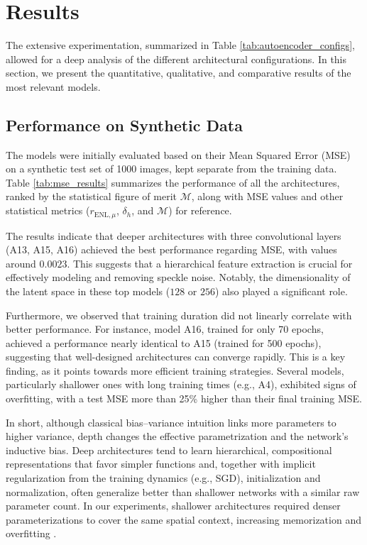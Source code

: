 \section{Results}

The extensive experimentation, summarized in Table \ref{tab:autoencoder_configs}, allowed for a deep analysis of the different architectural configurations. In this section, we present the quantitative, qualitative, and comparative results of the most relevant models.

\subsection{Performance on Synthetic Data}

The models were initially evaluated based on their Mean Squared Error (MSE) on a synthetic test set of 1000 images, kept separate from the training data. Table \ref{tab:mse_results} summarizes the performance of all the architectures, ranked by the statistical figure of merit $\mathcal{M}$, along with MSE values and other statistical metrics ($r_{\text{ENL},\mu}$, $\delta_h$, and $\mathcal{M}$) for reference.

The results indicate that deeper architectures with three convolutional layers (A13, A15, A16) achieved the best performance regarding MSE, with values around $0.0023$. This suggests that a hierarchical feature extraction is crucial for effectively modeling and removing speckle noise. Notably, the dimensionality of the latent space in these top models ($128$ or $256$) also played a significant role.

Furthermore, we observed that training duration did not linearly correlate with better performance. For instance, model A16, trained for only 70 epochs, achieved a performance nearly identical to A15 (trained for 500 epochs), suggesting that well-designed architectures can converge rapidly. This is a key finding, as it points towards more efficient training strategies. Several models, particularly shallower ones with long training times (e.g., A4), exhibited signs of overfitting, with a test MSE more than 25\% higher than their final training MSE.

In short, although classical bias--variance intuition links more parameters to higher variance, depth changes the effective parametrization and the network's inductive bias. Deep architectures tend to learn hierarchical, compositional representations that favor simpler functions and, together with implicit regularization from the training dynamics (e.g., SGD), initialization and normalization, often generalize better than shallower networks with a similar raw parameter count. In our experiments, shallower architectures required denser parameterizations to cover the same spatial context, increasing memorization and overfitting \cite{zhang2017understanding}.

